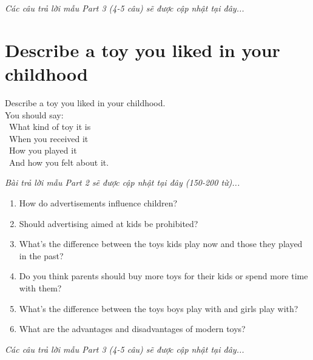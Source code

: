 \vspace{1em}
\textit{Các câu trả lời mẫu Part 3 (4-5 câu) sẽ được cập nhật tại đây...}
\vspace{2em}

\section{Describe a toy you liked in your childhood}
\begin{ieltsprompt}
Describe a toy you liked in your childhood. \\
You should say: \\
\textbullet\ What kind of toy it is \\
\textbullet\ When you received it \\
\textbullet\ How you played it \\
\textbullet\ And how you felt about it. \\
\end{ieltsprompt}

\vspace{1em}
\textit{Bài trả lời mẫu Part 2 sẽ được cập nhật tại đây (150-200 từ)...}
\vspace{2em}

\begin{ieltsprompt}
\begin{enumerate}[itemsep=4pt]
    \item How do advertisements influence children?
    \item Should advertising aimed at kids be prohibited?
    \item What's the difference between the toys kids play now and those they played in the past?
    \item Do you think parents should buy more toys for their kids or spend more time with them?
    \item What's the difference between the toys boys play with and girls play with?
    \item What are the advantages and disadvantages of modern toys?
\end{enumerate}
\end{ieltsprompt}

\vspace{1em}
\textit{Các câu trả lời mẫu Part 3 (4-5 câu) sẽ được cập nhật tại đây...}
\vspace{2em}

